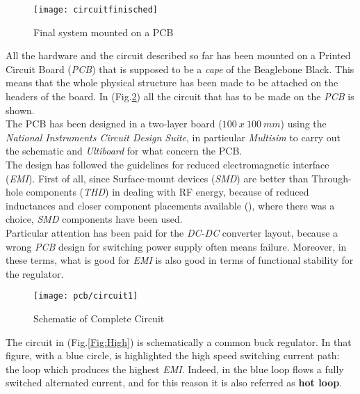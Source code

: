 \begin{figure}[h]
	\centering
	\texttt{[image: circuitfinisched]}
	\caption{Final system mounted on a PCB}
	\label{Fig:finalcircuit}
\end{figure}


All the hardware and the circuit described so far has been mounted on a Printed Circuit Board (\textit{PCB}) that is supposed to be a \textit{cape} of the Beaglebone Black. This means that the whole physical structure has been made to be attached on the headers of the board. In (Fig.\ref{Fig:circuit}) all the circuit that has to be made on the \textit{PCB} is shown.\\

The PCB has been designed in a two-layer board ($100\ x\ 100\ mm$) using the \textit{National Instruments Circuit Design Suite},  in particular \textit{Multisim} to carry out the schematic and \textit{Ultiboard} for what concern the PCB.\\
The design has followed the guidelines for reduced electromagnetic interface (\textit{EMI}). First of all, since Surface-mount devices (\textit{SMD}) are better than Through-hole components (\textit{THD}) in dealing with RF energy, because of reduced inductances and closer component placements available (\cite{PDGFRE}), where there was a choice, \textit{SMD} components have been used. \\

Particular attention has been paid for the \textit{DC-DC} converter layout, because a wrong \textit{PCB} design for switching power supply often means failure. Moreover, in these terms, what is good for \textit{EMI} is also good in terms of functional stability for the regulator.\\




\begin{figure}[t]
	\begin{center}
	\texttt{[image: pcb/circuit1]}
	\caption{Schematic of Complete Circuit}
	\label{Fig:circuit}
	\end{center}
	
	
\end{figure}

 \clearpage
 
 The circuit in (Fig.\ref{Fig:High}) is schematically a common buck regulator. In that figure, with a blue circle, is highlighted the high speed switching current path: the loop which produces the highest \textit{EMI}. Indeed, in  the blue loop flows a fully switched alternated current, and for this reason it is also referred as \textbf{hot loop}.

